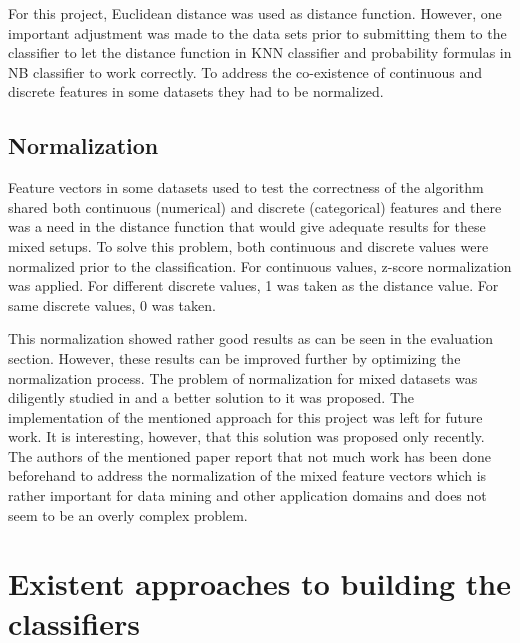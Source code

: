 \documentclass{llncs}
\begin{document}
For this project, Euclidean distance was used as distance function. However, one important adjustment was made to the data sets prior to submitting them to the classifier to let the distance function in KNN classifier and probability formulas in NB classifier to work correctly. To address the co-existence of continuous and discrete features in some datasets they had to be normalized.  

\subsection{Normalization}

Feature vectors in some datasets used to test the correctness of the algorithm shared both continuous (numerical) and discrete (categorical) features and there was a need in the distance function that would give adequate results for these mixed setups. To solve this problem, both continuous and discrete values were normalized prior to the classification. For continuous values, z-score normalization was applied. For different discrete values, 1 was taken as the distance value. For same discrete values, 0 was taken.

This normalization showed rather good results as can be seen in the evaluation section. However, these results can be improved further by optimizing the normalization process. The problem of normalization for mixed datasets was diligently studied in \cite{Suarez} and a better solution to it was proposed. The implementation of the mentioned approach for this project was left for future work. It is interesting, however, that this solution was proposed only recently. The authors of the mentioned paper report that not much work has been done beforehand to address the normalization of the mixed feature vectors which is rather important for data mining and other application domains and does not seem to be an overly complex problem.

\section{Existent approaches to building the classifiers}
\end{document}
